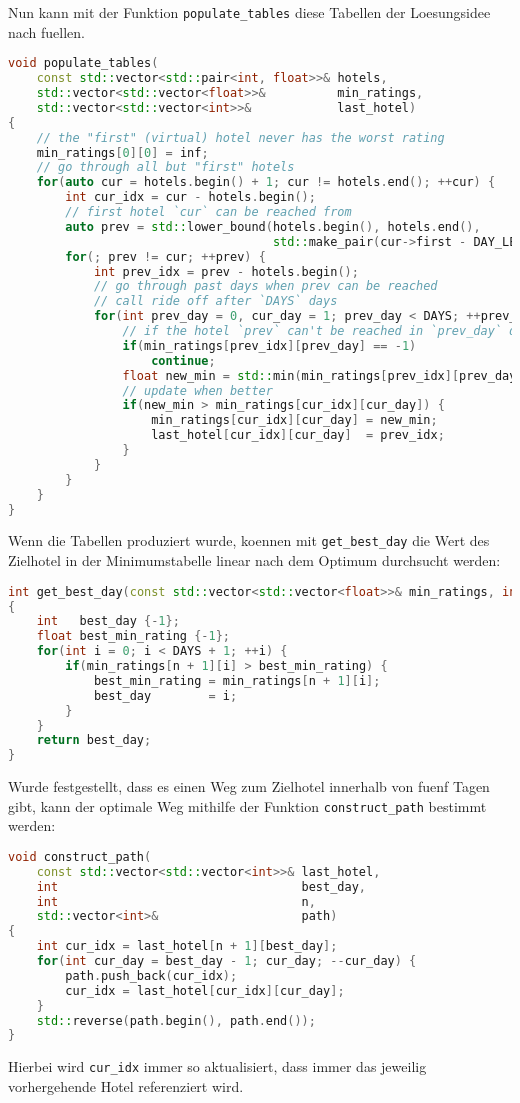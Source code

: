\documentclass[a4paper,10pt,ngerman]{scrartcl}
\begin{document}
Nun kann mit der Funktion \lstinline{populate_tables} diese Tabellen der Loesungsidee nach fuellen.
\begin{lstlisting}[language=C++]
void populate_tables(
    const std::vector<std::pair<int, float>>& hotels,
    std::vector<std::vector<float>>&          min_ratings,
    std::vector<std::vector<int>>&            last_hotel)
{
    // the "first" (virtual) hotel never has the worst rating
    min_ratings[0][0] = inf;
    // go through all but "first" hotels
    for(auto cur = hotels.begin() + 1; cur != hotels.end(); ++cur) {
        int cur_idx = cur - hotels.begin();
        // first hotel `cur` can be reached from
        auto prev = std::lower_bound(hotels.begin(), hotels.end(),
                                     std::make_pair(cur->first - DAY_LEN, .0f));
        for(; prev != cur; ++prev) {
            int prev_idx = prev - hotels.begin();
            // go through past days when prev can be reached
            // call ride off after `DAYS` days
            for(int prev_day = 0, cur_day = 1; prev_day < DAYS; ++prev_day, ++cur_day) {
                // if the hotel `prev` can't be reached in `prev_day` days
                if(min_ratings[prev_idx][prev_day] == -1)
                    continue;
                float new_min = std::min(min_ratings[prev_idx][prev_day], cur->second);
                // update when better
                if(new_min > min_ratings[cur_idx][cur_day]) {
                    min_ratings[cur_idx][cur_day] = new_min;
                    last_hotel[cur_idx][cur_day]  = prev_idx;
                }
            }
        }
    }
}
\end{lstlisting}

Wenn die Tabellen produziert wurde, koennen mit \lstinline{get_best_day} die Wert des \glqq{}Zielhotel\grqq{} in der Minimumstabelle linear nach dem Optimum durchsucht werden:
\begin{lstlisting}[language=C++]
int get_best_day(const std::vector<std::vector<float>>& min_ratings, int n)
{
    int   best_day {-1};
    float best_min_rating {-1};
    for(int i = 0; i < DAYS + 1; ++i) {
        if(min_ratings[n + 1][i] > best_min_rating) {
            best_min_rating = min_ratings[n + 1][i];
            best_day        = i;
        }
    }
    return best_day;
}
\end{lstlisting}

Wurde festgestellt, dass es einen Weg zum \glqq{}Zielhotel\grqq{} innerhalb von fuenf Tagen gibt, kann der optimale Weg mithilfe der Funktion \lstinline{construct_path} bestimmt werden:
\begin{lstlisting}[language=C++]
void construct_path(
    const std::vector<std::vector<int>>& last_hotel,
    int                                  best_day,
    int                                  n,
    std::vector<int>&                    path)
{
    int cur_idx = last_hotel[n + 1][best_day];
    for(int cur_day = best_day - 1; cur_day; --cur_day) {
        path.push_back(cur_idx);
        cur_idx = last_hotel[cur_idx][cur_day];
    }
    std::reverse(path.begin(), path.end());
}
\end{lstlisting}
Hierbei wird \lstinline{cur_idx} immer so aktualisiert, dass immer das jeweilig vorhergehende Hotel referenziert wird.
\end{document}
